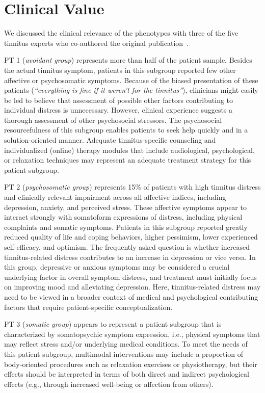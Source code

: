 \documentclass[
  oneside]{book}
\begin{document}
\hypertarget{phenotypes-clinical-interpretation}{%
\section{Clinical Value}\label{phenotypes-clinical-interpretation}}

We discussed the clinical relevance of the phenotypes with three of the five tinnitus experts who co-authored the original publication~\autocite{Niemann:SREP_Pheno2020}.

PT 1 (\emph{avoidant group}) represents more than half of the patient sample.
Besides the actual tinnitus symptom, patients in this subgroup reported few other affective or psychosomatic symptoms.
Because of the biased presentation of these patients (\emph{``everything is fine if it weren't for the tinnitus''}), clinicians might easily be led to believe that assessment of possible other factors contributing to individual distress is unnecessary.
However, clinical experience suggests a thorough assessment of other psychosocial stressors.
The psychosocial resourcefulness of this subgroup enables patients to seek help quickly and in a solution-oriented manner.
Adequate tinnitus-specific counseling and individualized (online) therapy modules that include audiological, psychological, or relaxation techniques may represent an adequate treatment strategy for this patient subgroup.

PT 2 (\emph{psychosomatic group}) represents 15\% of patients with high tinnitus distress and clinically relevant impairment across all affective indices, including depression, anxiety, and perceived stress.
These affective symptoms appear to interact strongly with somatoform expressions of distress, including physical complaints and somatic symptoms.
Patients in this subgroup reported greatly reduced quality of life and coping behaviors, higher pessimism, lower experienced self-efficacy, and optimism.
The frequently asked question is whether increased tinnitus-related distress contributes to an increase in depression or vice versa.
In this group, depressive or anxious symptoms may be considered a crucial underlying factor in overall symptom distress, and treatment must initially focus on improving mood and alleviating depression.
Here, tinnitus-related distress may need to be viewed in a broader context of medical and psychological contributing factors that require patient-specific conceptualization.

PT 3 (\emph{somatic group}) appears to represent a patient subgroup that is
characterized by somatopsychic symptom expression, i.e., physical symptoms that may reflect stress and/or underlying medical conditions.
To meet the needs of this patient subgroup, multimodal interventions may include a proportion of body-oriented procedures such as relaxation exercises or physiotherapy, but their effects should be interpreted in terms of both direct and indirect psychological effects (e.g., through increased well-being or affection from others).
\end{document}
